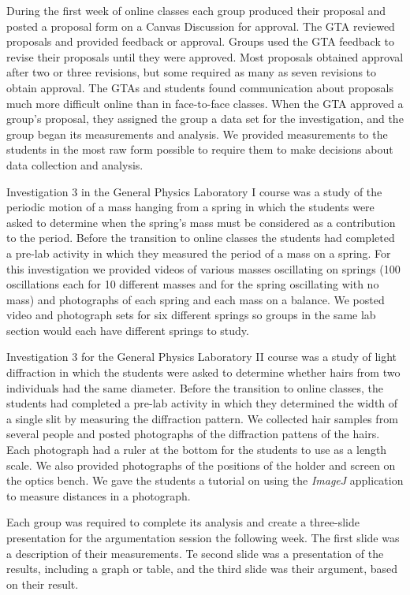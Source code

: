 \documentclass[aip, numerical, preprint]{revtex4-2}
\begin{document}
During the first week of online classes each group produced their proposal and posted a proposal form on a Canvas
Discussion for approval. The GTA reviewed proposals and
provided feedback or approval. Groups used the GTA feedback to revise their proposals until they
were approved. Most proposals obtained approval after two or three revisions, but some required
as many as seven revisions to obtain approval. The GTAs and students found communication about
proposals much more difficult online than in face-to-face classes. When the GTA approved a group's proposal, they assigned the group a data set for the
investigation, and the group began its measurements and analysis. We provided measurements to
the students in the most raw form possible to require them to make decisions about data
collection and analysis. 

Investigation 3 in the General Physics Laboratory I course was a study of the periodic motion
of a mass hanging from a spring in which the students were asked to determine when the spring's
mass must be considered as a contribution to the period. Before the transition to online
classes the students had completed a pre-lab activity in which they measured the period of a
mass on a spring. For this investigation we provided videos of various masses oscillating on
springs (100 oscillations each for 10 different masses and for the spring oscillating with no
mass) and photographs of each spring and each mass on a balance. We posted video and photograph
sets for six different springs so groups in the same lab section would each have different
springs to study.

Investigation 3 for the General Physics Laboratory II course was a study of light diffraction
in which the students were asked to determine whether hairs from two individuals had the same
diameter. Before the transition to online classes, the students had completed a pre-lab
activity in which they determined the width of a single slit by measuring the diffraction
pattern. We collected hair samples from several people and posted photographs of the
diffraction pattens of the hairs. Each photograph had a ruler at the bottom for the students to
use as a length scale. We also provided photographs of the positions of the holder and screen
on the optics bench. We gave the students a tutorial on using the \emph{ImageJ}
application\citep{schrasetal12} to measure distances in a photograph.

Each group was required to complete its analysis and create a
three-slide presentation for the argumentation session the following week. The first slide was
a description of their measurements. Te second slide was a presentation of the results,
including a graph or table, and the third slide was their argument, based on their result.
\end{document}
